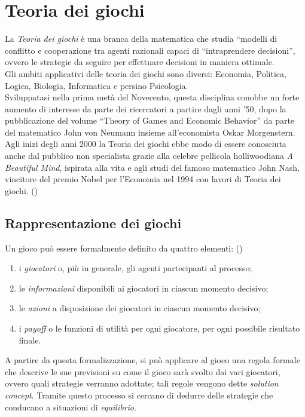 \section{Teoria dei giochi}

La \emph{Teoria dei giochi} è una branca della matematica che studia ``modelli di conflitto e cooperazione tra agenti razionali capaci di ``intraprendere decisioni'', \cite{gtheory} ovvero le strategie da seguire per effettuare decisioni in maniera ottimale.\\
Gli ambiti applicativi delle teoria dei giochi sono diversi: Economia, Politica, Logica, Biologia, Informatica e persino Psicologia.\\
Sviluppatasi nella prima metà del Novecento, questa disciplina conobbe un forte aumento di interesse da parte dei ricercatori a partire dagli anni '50, dopo la pubblicazione del volume ``Theory of Games and Economic Behavior'' da parte del matematico John von Neumann insieme all'economista Oskar Morgenstern. %
Agli inizi degli anni 2000 la Teoria dei giochi ebbe modo di essere conosciuta anche dal pubblico non specialista grazie alla celebre pellicola holliwoodiana \emph{A Beautiful Mind}, ispirata alla vita e agli studi del famoso matematico John Nash, vincitore del premio Nobel per l'Economia nel 1994 con lavori di Teoria dei giochi. (\cite{jnash})


\subsection{Rappresentazione dei giochi}

Un gioco può essere formalmente definito da quattro elementi: (\cite{ramusen})
\begin{enumerate}
   \item i \emph{giocatori} o, più in generale, gli agenti partecipanti al processo;
   \item le \emph{informazioni} disponibili ai giocatori in ciascun momento decisivo;
   \item le \emph{azioni} a disposizione dei giocatori in ciascun momento decisivo;
   \item i \emph{payoff} o le funzioni di utilità per ogni giocatore, per ogni possibile risultato finale.   
\end{enumerate}
A partire da questa formalizzazione, si  può applicare al gioco una regola formale che descrive le sue previsioni su come il gioco sarà svolto dai vari giocatori, ovvero quali strategie verranno adottate; tali regole vengono dette \emph{solution concept}. Tramite questo processo si cercano di dedurre delle strategie che conducano a situazioni di \emph{equilibrio}.



